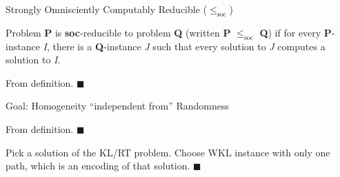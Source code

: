 \begin{frame}{Strongly Omnisciently Computably Reducible
($\leq_{\text{soc}}$)}
  \begin{define*}
    Problem \textbf{P} is \textbf{soc}-reducible to problem \textbf{Q}
    (written \textbf{P} $\leq_{\text{soc}}$ \textbf{Q}) if for every
    \textbf{P}-instance \textit{I}, there is a \textbf{Q}-instance
    \textit{J} such that every solution to \textit{J} computes a solution
    to \textit{I}.
  \end{define*}

  \begin{observe*}
    From definition. $\blacksquare$
  \end{observe*}

  \begin{center}
  \end{center}
\end{frame}

\begin{frame}{Goal: Homogeneity ``independent from'' Randomness}
  \begin{observe*}
    From definition. $\blacksquare$
  \end{observe*}

  \begin{observe*}
    Pick a solution of the KL/RT problem. Choose WKL instance with only
    one path, which is an encoding of that solution. $\blacksquare$
  \end{observe*}

  \begin{center}
  \end{center}
\end{frame}
